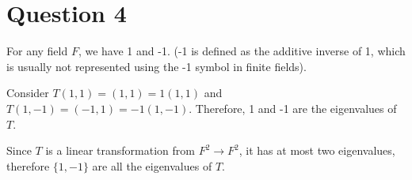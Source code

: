 \section*{Question 4}
For any field $ F $, we have 1 and -1. (-1 is defined as the additive inverse of 1, which is usually not represented using the -1 symbol in finite fields).

Consider $ T(1,1) = (1,1) = 1(1,1) $ and $ T(1, -1) = (-1,1) = -1(1,-1) $. Therefore, 1 and -1 are the eigenvalues of $ T $.

Since $ T $ is a linear transformation from $ F^2 \to F^2 $, it has at most two eigenvalues, therefore $ \{1, -1\} $ are all the eigenvalues of $ T $.